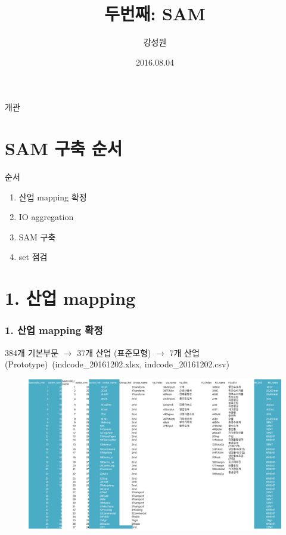 \documentclass{beamer}
\title %
{두번째: SAM}
\author{강성원}													%
\institute[KEI] 															%
{KEI}													%
\date[08-11-09] 														%
{2016.08.04}																			%
\begin{document}
\begin{frame}
	\titlepage
\end{frame}
%
\begin{frame}{개관}
	\tableofcontents
\end{frame}
\section{SAM 구축 순서}
\begin{frame}{순서}
	\begin{enumerate}
		\item {산업 mapping 확정}
		\item {IO aggregation}
	    \item {SAM 구축 }
		\item {set 점검}
	\end{enumerate}
\end{frame}

\section{1. 산업 mapping}
\begin{frame}
	\frametitle{1. 산업 mapping 확정}
	384개 기본부문 $\rightarrow$ 37개 산업 (표준모형) $\rightarrow$ 7개 산업 (Prototype)\
	(indcode\_20161202.xlsx, indcode\_20161202.csv)
	\begin{figure}
		\centering
		\includegraphics[width=1.00\textwidth]{map.png}
	\end{figure}
\end{frame}
\end{document}
